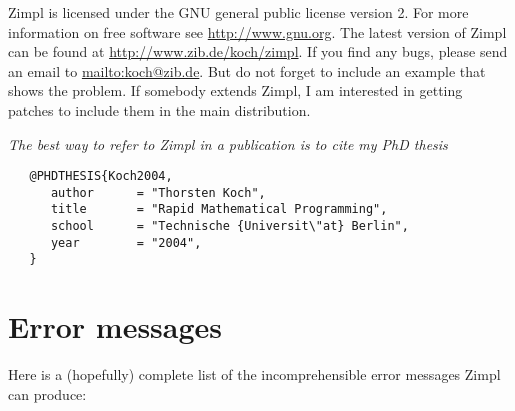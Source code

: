 \documentclass[11pt]{article}
\newcommand{\zimpl}{{\sc Zimpl}\xspace}
\begin{document}
\bigskip
\zimpl is licensed under the GNU general public license version 2.
For more information on free software see \url{http://www.gnu.org}.
The latest version of \zimpl can be found at
\url{http://www.zib.de/koch/zimpl}.
If you find any bugs, please send an email to
\url{mailto:koch@zib.de}. 
But do not forget to 
include an example that shows the problem.
If somebody extends \zimpl, I am interested in getting patches
to include them in the main distribution.

\bigskip
\noindent\emph{The best way to refer to \zimpl in a publication is to cite my
  PhD thesis \cite{Koch2004}}
\begin{verbatim}
   @PHDTHESIS{Koch2004,
      author      = "Thorsten Koch",
      title       = "Rapid Mathematical Programming",
      school      = "Technische {Universit\"at} Berlin",
      year        = "2004",
   }   
\end{verbatim}


\section{Error messages}
Here is a (hopefully) complete list of the incomprehensible error messages \zimpl
can produce:



\nocite{*}
\small


\end{document}
